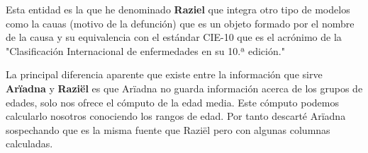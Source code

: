 Esta entidad es la que he denominado \textbf{Raziel} que integra otro tipo de modelos como la cauas (motivo de la defunción) que es un objeto formado por el nombre de la causa y su equivalencia con el estándar \gls{CIE-10} que es el acrónimo de la "Clasificación Internacional de enfermedades en su 10.ª edición."

La principal diferencia aparente que existe entre la información que sirve \textbf{Arïadna} y \textbf{Raziël} es que Arïadna no guarda información acerca de los grupos de edades, solo nos ofrece el cómputo de la edad media. Este cómputo podemos calcularlo nosotros conociendo los rangos de edad. Por tanto descarté Arïadna sospechando que es la misma fuente que Raziël pero con algunas columnas calculadas.